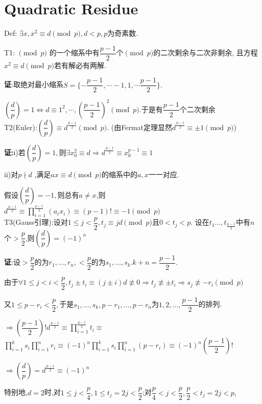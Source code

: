 \section{Quadratic Residue}
Def: $ \exists x,x^2\equiv d \pmod p,d<p,p$为奇素数.

T1: $ \pmod p$ 的一个缩系中有$	\dfrac{p-1}{2}$个$ \pmod p$的二次剩余与二次非剩余,
且方程$ x^2 \equiv d \pmod p$若有解必有两解.

{\bf 证}:取绝对最小缩系$ S = \{ -\dfrac{p-1}{2},\cdots -1, 1,\cdots \dfrac{p-1}{2}\}.$ 

$ (\dfrac{d}{p})= 1\Leftrightarrow d \equiv 1^2,\cdots,(\dfrac{p-1}{2})^2 \pmod p. $于是有$ \dfrac{p-1}{2}$个二次剩余
\\

T2(Euler):$ ( \dfrac{d}{p} )\equiv d^{\frac{p-1}{2}} \pmod p$.
(由Fermat定理显然$ d^{\frac{p-1}{2}}\equiv \pm 1 \pmod p$)

{\bf 证:}i)若$ (\dfrac{d}{p})=1,$则$ \exists x_0^2\equiv d\Rightarrow d^{\frac{p-1}{2}}\equiv x_0^{p-1}\equiv 1$

ii)对$ p \nmid d$ ,满足$ ax\equiv d\pmod p$的缩系中的$ a,x$一一对应.

假设$ (\dfrac{d}{p})=-1,$则总有$ a\ne x$,则$ d^{\frac{p-1}{2}}\equiv \prod_{i=1}^{\frac{p-1}{2}}{(a_ix_i)}\equiv (p-1)!\equiv -1\pmod p$
\\

T3(Gauss引理):设对$ 1\le j < \dfrac{p}{2},t_j\equiv jd \pmod p$且$ 0<t_j<p$.
设在$ t_1\ldots,t_{\frac{p-1}{2}}$中有$ n$个$ >\dfrac{p}{2}$,则$ (\dfrac{d}{p})=(-1)^n$

{\bf 证}:设$ >\dfrac{p}{2}$的为$ r_1,\ldots,r_n,<\dfrac{p}{2}$的为$ s_1,\ldots,s_k.k+n=\dfrac{p-1}{2}$.

由于$ \forall 1\le j<i<\dfrac{p}{2},t_j\pm t_i\equiv (j\pm i)d \not \equiv 0\Rightarrow t_j\not\equiv \pm t_i\Rightarrow s_j\not\equiv -r_i\pmod p$

又$ 1\le p-r_i<\dfrac{p}{2},$于是$ s_1,\ldots,s_k,p-r_1,\ldots,p-r_n$为$ 1,2,\ldots,\dfrac{p-1}{2}$的排列.

$ \Rightarrow (\dfrac{p-1}{2})!d^{\frac{p-1}{2}}\equiv \prod_{i=1}^{\frac{p-1}{2}}{t_i}\equiv$ 
$\prod_{i=1}^{k}{s_i}\prod_{i=1}^{n}{r_i}\equiv (-1)^n\prod_{i=1}^{k}{s_i}\prod_{i=1}^{n}{(p-r_i)}\equiv (-1)^n(\dfrac{p-1}{2})!$

$ \Rightarrow (\dfrac{d}{p})=d^{\frac{p-1}{2}}\equiv(-1)^n$

特别地,$ d=2$时,对$ 1\le j < \dfrac{p}{4}, 1\le t_j = 2j < \dfrac{p}{2}$;对$ \dfrac{p}{4} < j < \dfrac{p}{2}, \dfrac{p}{2}< t_j = 2j <p, $ 

